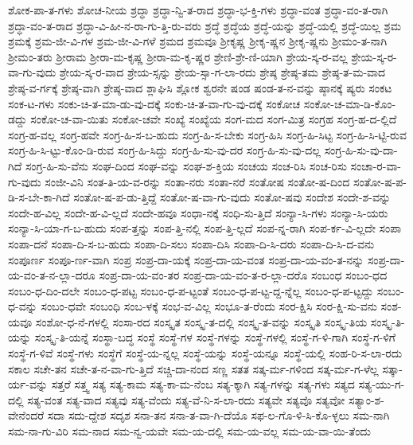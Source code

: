 {ಶೋಕ-ಪಾ-ತ-ಗಳು
ಶೋಚ-ನೀಯ
ಶ್ರದ್ಧಾ
ಶ್ರದ್ಧಾ-ನ್ವಿ-ತ-ರಾದ
ಶ್ರದ್ಧಾ-ಭ-ಕ್ತಿ-ಗಳು
ಶ್ರದ್ಧಾ-ವಂತ
ಶ್ರದ್ಧಾ-ವಂ-ತ-ರಾಗಿ
ಶ್ರದ್ಧಾ-ವಂ-ತ-ರಾದ
ಶ್ರದ್ಧಾ-ವಿ-ಹೀ-ನ-ರಾ-ಗು-ತ್ತಿ-ರು-ವರು
ಶ್ರದ್ಧೆ
ಶ್ರದ್ಧೆಯ
ಶ್ರದ್ಧೆ-ಯನ್ನು
ಶ್ರದ್ಧೆ-ಯಲ್ಲಿ
ಶ್ರದ್ಧೆ-ಯಿಲ್ಲ
ಶ್ರಮ
ಶ್ರಮಕ್ಕೆ
ಶ್ರಮ-ಜೀ-ವಿ-ಗಳ
ಶ್ರಮ-ಜೀ-ವಿ-ಗಳೆ
ಶ್ರಮದ
ಶ್ರಮವೂ
ಶ್ರೀಕೃಷ್ಣ
ಶ್ರೀಕೃ-ಷ್ಣನ
ಶ್ರೀಕೃ-ಷ್ಣನು
ಶ್ರೀಮಂ-ತ-ನಾಗಿ
ಶ್ರೀಮಂ-ತರು
ಶ್ರೀರಾಮ
ಶ್ರೀರಾ-ಮ-ಕೃಷ್ಣ
ಶ್ರೀರಾ-ಮ-ಕೃ-ಷ್ಣರ
ಶ್ರೇಣಿ-ಶ್ರೇ-ಣಿ-ಯಾಗಿ
ಶ್ರೇಯ-ಸ್ಕ-ರ-ವಲ್ಲ
ಶ್ರೇಯ-ಸ್ಕ-ರ-ವಾ-ಗು-ವುದು
ಶ್ರೇಯ-ಸ್ಕ-ರ-ವಾದ
ಶ್ರೇಯ-ಸ್ಸನ್ನು
ಶ್ರೇಯ-ಸ್ಸಾ-ಗ-ಲಾ-ರದು
ಶ್ರೇಷ್ಠ
ಶ್ರೇಷ್ಠ-ತಮ
ಶ್ರೇಷ್ಠ-ತ-ಮ-ವಾದ
ಶ್ರೇಷ್ಠ-ವ-ರ್ಗಕ್ಕೆ
ಶ್ರೇಷ್ಠ-ವಾಗಿ
ಶ್ರೇಷ್ಠ-ವಾದ
ಶ್ಲಾಘಿಸಿ
ಶ್ಲೋಕ
ಶ್ವರನೇ
ಷಂಡ
ಷಂಡ-ತ-ನ-ವನ್ನು
ಷ್ಠಾನಕ್ಕೆ
ಷ್ಯರು
ಸಂಕಟ
ಸಂಕ-ಟ-ಗಳು
ಸಂಕು-ಚಿ-ತ-ಮಾ-ಡು-ವು-ದಕ್ಕೆ
ಸಂಕು-ಚಿ-ತ-ವಾ-ಗು-ವು-ದಕ್ಕೆ
ಸಂಕೋಚ
ಸಂಕೋ-ಚ-ಮಾ-ಡಿ-ಕೊಂ-ಡದ್ದು
ಸಂಕೋ-ಚ-ವಾ-ಯಿತು
ಸಂಕೋ-ಚವೇ
ಸಂಖ್ಯೆ
ಸಂಖ್ಯೆಯ
ಸಂಗ-ಮದ
ಸಂಗ-ಮಿತ್ರ
ಸಂಗ್ರಹ
ಸಂಗ್ರ-ಹ-ದ-ಲ್ಲಿದೆ
ಸಂಗ್ರ-ಹ-ವಲ್ಲ
ಸಂಗ್ರ-ಹವೇ
ಸಂಗ್ರ-ಹಿ-ಸ-ಬ-ಹುದು
ಸಂಗ್ರ-ಹಿ-ಸ-ಬೇಕು
ಸಂಗ್ರ-ಹಿಸಿ
ಸಂಗ್ರ-ಹಿ-ಸಿಟ್ಟ
ಸಂಗ್ರ-ಹಿ-ಸಿ-ಟ್ಟಿ-ರುವ
ಸಂಗ್ರ-ಹಿ-ಸಿ-ಟ್ಟು-ಕೊಂ-ಡಿ-ರುವ
ಸಂಗ್ರ-ಹಿ-ಸಿದ್ದು
ಸಂಗ್ರ-ಹಿ-ಸು-ವು-ದರ
ಸಂಗ್ರ-ಹಿ-ಸು-ವು-ದಲ್ಲ
ಸಂಗ್ರ-ಹಿ-ಸು-ವು-ದಾ-ಗಿದೆ
ಸಂಗ್ರ-ಹಿ-ಸು-ವೆನು
ಸಂಘ-ದಿಂದ
ಸಂಘ-ವನ್ನು
ಸಂಘ-ಶ-ಕ್ತಿಯ
ಸಂಚಯ
ಸಂಚ-ರಿಸಿ
ಸಂಚ-ರಿಸು
ಸಂಚಾ-ರ-ವಾ-ಗು-ವುದು
ಸಂಜೀ-ವಿನಿ
ಸಂತ-ತಿ-ಯ-ವ-ರನ್ನು
ಸಂತಾ-ನರು
ಸಂತಾ-ನರೆ
ಸಂತೋಷ
ಸಂತೋ-ಷ-ದಿಂದ
ಸಂತೋ-ಷ-ಪ-ಡಿ-ಸ-ಬೇ-ಕಾ-ಗಿದೆ
ಸಂತೋ-ಷ-ಪ-ಡು-ತ್ತಿದ್ದೆ
ಸಂತೋ-ಷ-ವಾ-ಗು-ವುದು
ಸಂತೋ-ಷವು
ಸಂದೇಶ
ಸಂದೇ-ಶ-ವನ್ನು
ಸಂದೇ-ಹ-ವಿಲ್ಲ
ಸಂದೇ-ಹ-ವಿ-ಲ್ಲದೆ
ಸಂದೇ-ಹವೂ
ಸಂಧಾ-ನಕ್ಕೆ
ಸಂಧಿ-ಸು-ತ್ತಿದೆ
ಸಂನ್ಯಾ-ಸಿ-ಗಳು
ಸಂನ್ಯಾ-ಸಿ-ಯರು
ಸಂನ್ಯಾ-ಸಿ-ಯಾ-ಗ-ಬ-ಹುದು
ಸಂಪ-ತ್ತನ್ನು
ಸಂಪ-ತ್ತಿ-ನಲ್ಲಿ
ಸಂಪ-ತ್ತಿ-ಲ್ಲದೆ
ಸಂಪ-ನ್ನ-ರಾಗಿ
ಸಂಪ-ರ್ಕ-ವಿ-ಲ್ಲದೇ
ಸಂಪಾ
ಸಂಪಾ-ದನೆ
ಸಂಪಾ-ದಿ-ಸ-ಬ-ಹುದು
ಸಂಪಾ-ದಿ-ಸಲು
ಸಂಪಾ-ದಿಸಿ
ಸಂಪಾ-ದಿ-ಸಿ-ದರು
ಸಂಪಾ-ದಿ-ಸಿ-ದ-ವನು
ಸಂಪೂರ್ಣ
ಸಂಪೂ-ರ್ಣ-ವಾಗಿ
ಸಂಪ್ರ
ಸಂಪ್ರ-ದಾ-ಯಕ್ಕೆ
ಸಂಪ್ರ-ದಾ-ಯ-ವಂತ
ಸಂಪ್ರ-ದಾ-ಯ-ವಂ-ತ-ನನ್ನು
ಸಂಪ್ರ-ದಾ-ಯ-ವಂ-ತ-ನ-ಲ್ಲಾ-ದರೂ
ಸಂಪ್ರ-ದಾ-ಯ-ವಂ-ತರ
ಸಂಪ್ರ-ದಾ-ಯ-ವಂ-ತ-ರ-ಲ್ಲಾ-ದರೊ
ಸಂಬಂಧ
ಸಂಬಂ-ಧದ
ಸಂಬಂ-ಧ-ದಿಂ-ದಲೇ
ಸಂಬಂ-ಧ-ಪಟ್ಟ
ಸಂಬಂ-ಧ-ಪ-ಟ್ಟಂತೆ
ಸಂಬಂ-ಧ-ಪ-ಟ್ಟ-ದ್ದ-ನ್ನೆಲ್ಲ
ಸಂಬಂ-ಧ-ಪ-ಟ್ಟದ್ದು
ಸಂಬಂ-ಧ-ವನ್ನು
ಸಂಬಂ-ಧವೇ
ಸಂಬಂಧಿ
ಸಂಬ-ಳಕ್ಕೆ
ಸಂಭ-ವ-ವಿಲ್ಲ
ಸಂಭೂ-ತ-ರೆಂದು
ಸಂರ-ಕ್ಷಿಸಿ
ಸಂರ-ಕ್ಷಿ-ಸು-ವನು
ಸಂಶ-ಯವೂ
ಸಂಶೋ-ಧ-ನೆ-ಗಳಲ್ಲಿ
ಸಂಸಾ-ರದ
ಸಂಸ್ಕೃತ
ಸಂಸ್ಕೃ-ತ-ದಲ್ಲಿ
ಸಂಸ್ಕೃ-ತ-ವನ್ನು
ಸಂಸ್ಕೃತಿ
ಸಂಸ್ಕೃ-ತಿಯ
ಸಂಸ್ಕೃ-ತಿ-ಯನ್ನು
ಸಂಸ್ಕೃ-ತಿ-ಯನ್ನೆ
ಸಂಸ್ಥಾ-ಬದ್ಧ
ಸಂಸ್ಥೆ
ಸಂಸ್ಥೆ-ಗಳ
ಸಂಸ್ಥೆ-ಗಳನ್ನು
ಸಂಸ್ಥೆ-ಗಳಲ್ಲಿ
ಸಂಸ್ಥೆ-ಗ-ಳಿ-ಗಾಗಿ
ಸಂಸ್ಥೆ-ಗ-ಳಿಗೆ
ಸಂಸ್ಥೆ-ಗ-ಳಿವೆ
ಸಂಸ್ಥೆ-ಗಳು
ಸಂಸ್ಥೆಗೆ
ಸಂಸ್ಥೆ-ಯ-ನ್ನಲ್ಲ
ಸಂಸ್ಥೆ-ಯನ್ನು
ಸಂಸ್ಥೆ-ಯನ್ನೂ
ಸಂಸ್ಥೆ-ಯಲ್ಲಿ
ಸಂಹ-ರಿ-ಸ-ಲಾ-ರದು
ಸಕಾಲ
ಸಚೇ-ತನ
ಸಚೇ-ತ-ನ-ವಾ-ಗು-ತ್ತಿದೆ
ಸಚ್ಚಿ-ದಾ-ನಂದ
ಸಣ್ಣ
ಸತತ
ಸತ್ಕ-ರ್ಮ-ಗಳಿಂದ
ಸತ್ಕ-ರ್ಮ-ಗ-ಳೆಲ್ಲ
ಸತ್ಕಾ-ರ್ಯ-ವನ್ನು
ಸತ್ತರೆ
ಸತ್ತ್ವ
ಸತ್ಯ
ಸತ್ಯ-ಕಾಮ
ಸತ್ಯ-ಕಾ-ಮ-ನೆಂಬ
ಸತ್ಯ-ಕ್ಕಾಗಿ
ಸತ್ಯ-ಗಳನ್ನು
ಸತ್ಯ-ಗಳು
ಸತ್ಯದ
ಸತ್ಯ-ಯು-ಗ-ದಲ್ಲಿ
ಸತ್ಯ-ವಂತ
ಸತ್ಯ-ವಾದ
ಸತ್ಯವು
ಸತ್ಯ-ವೆಂದು
ಸತ್ಯ-ವೆ-ನಿ-ಸ-ಲಾ-ರದು
ಸತ್ಯವೇ
ಸತ್ಯವೊ
ಸತ್ಯವೋ
ಸತ್ಯಾಂ-ಶ-ವೇನೆಂದರೆ
ಸದಾ
ಸದು-ದ್ದೇಶ
ಸದೃಶ
ಸನಾ-ತನ
ಸನಾ-ತ-ವಾ-ಗಿ-ದೆಯೊ
ಸಫ-ಲ-ಗೊ-ಳಿ-ಸಿ-ಕೊ-ಳ್ಳಲು
ಸಮ-ನಾಗಿ
ಸಮ-ನಾ-ಗು-ವಿರಿ
ಸಮ-ನಾದ
ಸಮ-ನ್ವ-ಯವೇ
ಸಮ-ಯ-ದಲ್ಲಿ
ಸಮ-ಯ-ವಲ್ಲ
ಸಮ-ಯ-ವಾ-ಯಿ-ತೆಂದು
}
